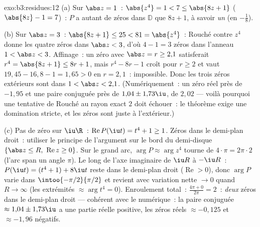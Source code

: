 \begin{solution}{exo:b3:residues:12}
(a) Sur $\abs z = 1$~: $\abs{z^4} = 1 < 7 \leq \abs{8z +
1}$ ($\abs{8z} - 1 = 7$)~: $P$ a autant de zéros dans
$\mathbb D$ que $8z + 1$, à savoir \emph{un} (en
$-\frac18$).

(b) Sur $\abs z = 3$~: $\abs{8z + 1} \leq 25 < 81 =
\abs{z^4}$~: Rouché contre $z^4$ donne les quatre zéros dans
$\abs z < 3$, d'où $4 - 1 = 3$ zéros dans l'anneau $1 < \abs
z < 3$. Affinage~: un zéro avec $\abs z = r \geq 2{,}1$
satisferait $r^4 = \abs{8z + 1} \leq 8r + 1$, mais $r^4 -
8r - 1$ croît pour $r \geq 2$ et vaut $19{,}45 - 16{,}8 - 1
= 1{,}65 > 0$ en $r = 2{,}1$~: impossible. Donc les trois
zéros extérieurs sont dans $1 < \abs z < 2{,}1$.
(Numériquement~: un zéro réel près de $-1{,}95$ et une paire
conjuguée près de $1{,}04 \pm 1{,}73\iu$, de  $2{,}02$
--- voilà pourquoi une tentative de Rouché au rayon exact
$2$ doit échouer~: le théorème exige une domination stricte,
et les zéros sont juste à l'extérieur.)

(c) Pas de zéro sur $\iu\R$~: $\operatorname{Re}P(\iu t) =
t^4 + 1 \geq 1$. Zéros dans le demi-plan droit~: utiliser le
principe de l'argument sur le bord du demi-disque $\{\abs z
\leq R,\ \operatorname{Re}z \geq 0\}$. Sur le grand arc,
$\arg P \approx \arg z^4$ tourne de $4\cdot\pi =
2\pi\cdot2$ (l'arc span un angle $\pi$). Le long de l'axe
imaginaire de $\iu R$ à $-\iu R$~: $P(\iu t) = (t^4 + 1) +
8\iu t$ reste dans le demi-plan droit ($\operatorname{Re} >
0$), donc $\arg P$ varie dans $\intoo{-\pi/2}{\pi/2}$ et
revient avec variation nette $\to 0$ quand $R \to \infty$
(les extrémités $\approx \arg t^4 = 0$). Enroulement
total~: $\frac{4\pi + 0}{2\pi} = 2$~: \emph{deux} zéros dans
le demi-plan droit --- cohérent avec le numérique~: la paire
conjuguée $\approx 1{,}04 \pm 1{,}73\iu$ a une partie réelle
positive, les zéros réels $\approx -0{,}125$ et $\approx
-1{,}96$ négatifs.
\end{solution}

